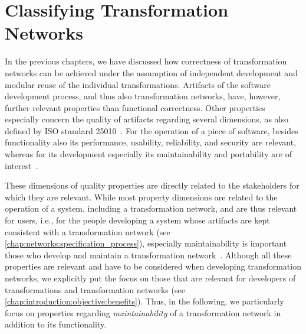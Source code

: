 \chapter{Classifying Transformation Networks
}
\label{chap:classification}

In the previous chapters, we have discussed how correctness of transformation networks can be achieved under the assumption of independent development and modular reuse of the individual transformations.
Artifacts of the software development process, and thus also transformation networks, have, however, further relevant properties than functional correctness.
Other properties especially concern the quality of artifacts regarding several dimensions, as also defined by ISO standard 25010~\cite{iso25010}.
For the operation of a piece of software, besides functionality also its performance, usability, reliability, and security are relevant, whereas for its development especially its maintainability and portability are of interest~\cite[Tab.~2]{iso25010}.

These dimensions of quality properties are directly related to the stakeholders for which they are relevant.
While most property dimensions are related to the operation of a system, including a transformation network, and are thus relevant for users, i.e., for the people developing a system whose artifacts are kept consistent with a transformation network (see \autoref{chap:networks:specification_process}), especially maintainability is important those who develop and maintain a transformation network~\cite[Tab.~2]{iso25010}.
Although all these properties are relevant and have to be considered when developing transformation networks, we explicitly put the focus on those that are relevant for developers of transformations and transformation networks (see \autoref{chap:introduction:objective:benefits}).
Thus, in the following, we particularly focus on properties regarding \emph{maintainability} of a transformation network in addition to its functionality.

